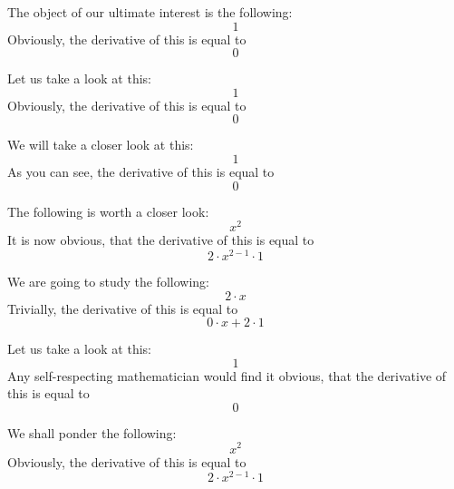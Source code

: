 \documentclass{article}
\begin{document}
The object of our ultimate interest is the following:
\begin{equation}
1 
\end{equation}
Obviously, the derivative of this is equal to
\begin{equation}
0 
\end{equation}

Let us take a look at this:
\begin{equation}
1 
\end{equation}
Obviously, the derivative of this is equal to
\begin{equation}
0 
\end{equation}

We will take a closer look at this:
\begin{equation}
1 
\end{equation}
As you can see, the derivative of this is equal to
\begin{equation}
0 
\end{equation}

The following is worth a closer look:
\begin{equation}
x ^{2 } 
\end{equation}
It is now obvious, that the derivative of this is equal to
\begin{equation}
2 \cdot x ^{2 - 1 } \cdot 1 
\end{equation}

We are going to study the following:
\begin{equation}
2 \cdot x 
\end{equation}
Trivially, the derivative of this is equal to
\begin{equation}
0 \cdot x + 2 \cdot 1 
\end{equation}

Let us take a look at this:
\begin{equation}
1 
\end{equation}
Any self-respecting mathematician would find it obvious, that the derivative of this is equal to
\begin{equation}
0 
\end{equation}

We shall ponder the following:
\begin{equation}
x ^{2 } 
\end{equation}
Obviously, the derivative of this is equal to
\begin{equation}
2 \cdot x ^{2 - 1 } \cdot 1 
\end{equation}
\end{document}
